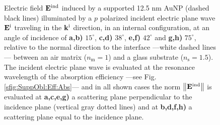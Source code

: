 \begin{figure}[h!]
{    Electric field $\vb{E}^\text{ind}$ induced by a supported 12.5 nm AuNP (dashed black lines) illuminated by a $p$ polarized incident electric plane wave $\vb{E}^\text{i}$ traveling in the $\vb{k}^\text{i}$ direction, in an internal configuration, at an angle of incidence of \textbf{a,b)} $15^\circ$, \textbf{c,d)} $38^\circ$, \textbf{e,f)} $42^\circ$ and \textbf{g,h)} $75^\circ$, relative to the normal direction to the interface ---white dashed lines--- between an air matrix ($n_\text{m} = 1$) and a glass substrate ($n_\text{s} = 1.5$). The incident electric plane wave is evaluated at the resonance wavelength of the absorption efficiency ---see Fig. \ref{sfig:SuppObl:Eff:Abs}--- and in all shown cases the norm $\norm{\vb{E}^\text{ind}}$ is evaluated at  \textbf{a,c,e,g)} a scattering plane perpendicular to the incidence plane (vertical gray dotted lines) and at \textbf{b,d,f,h)} a scattering plane equal to the incidence plane.
    }
    \label{fig:Near:SuppObl:p}
  \end{figure}
